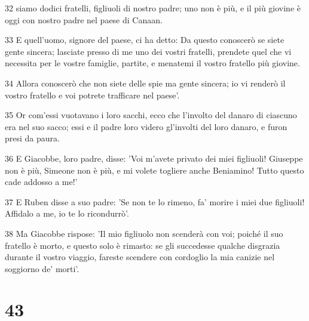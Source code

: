 \par 32 siamo dodici fratelli, figliuoli di nostro padre; uno non è più, e il più giovine è oggi con nostro padre nel paese di Canaan.
\par 33 E quell'uomo, signore del paese, ci ha detto: Da questo conoscerò se siete gente sincera; lasciate presso di me uno dei vostri fratelli, prendete quel che vi necessita per le vostre famiglie, partite, e menatemi il vostro fratello più giovine.
\par 34 Allora conoscerò che non siete delle spie ma gente sincera; io vi renderò il vostro fratello e voi potrete trafficare nel paese'.
\par 35 Or com'essi vuotavano i loro sacchi, ecco che l'involto del danaro di ciascuno era nel suo sacco; essi e il padre loro videro gl'involti del loro danaro, e furon presi da paura.
\par 36 E Giacobbe, loro padre, disse: 'Voi m'avete privato dei miei figliuoli! Giuseppe non è più, Simeone non è più, e mi volete togliere anche Beniamino! Tutto questo cade addosso a me!'
\par 37 E Ruben disse a suo padre: 'Se non te lo rimeno, fa' morire i miei due figliuoli! Affidalo a me, io te lo ricondurrò'.
\par 38 Ma Giacobbe rispose: 'Il mio figliuolo non scenderà con voi; poiché il suo fratello è morto, e questo solo è rimasto: se gli succedesse qualche disgrazia durante il vostro viaggio, fareste scendere con cordoglio la mia canizie nel soggiorno de' morti'.

\chapter{43}

